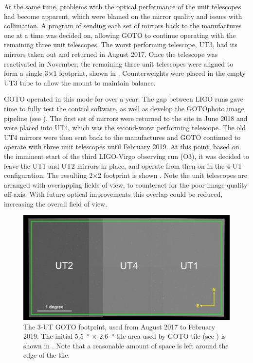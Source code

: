 \begin{colsection}
At the same time, problems with the optical performance of the unit telescopes had become apparent, which were blamed on the mirror quality and issues with collimation. A program of sending each set of mirrors back to the manufactures one at a time was decided on, allowing GOTO to continue operating with the remaining three unit telescopes. The worst performing telescope, UT3, had its mirrors taken out and returned in August 2017. Once the telescope was reactivated in November, the remaining three unit telescopes were aligned to form a single 3$\times$1 footprint, shown in . Counterweights were placed in the empty UT3 tube to allow the mount to maintain balance.

GOTO operated in this mode for over a year. The gap between LIGO runs gave time to fully test the control software, as well as develop the GOTOphoto image pipeline (see ). The first set of mirrors were returned to the site in June 2018 and were placed into UT4, which was the second-worst performing telescope. The old UT4 mirrors were then sent back to the manufactures and GOTO continued to operate with three unit telescopes until February 2019. At this point, based on the imminent start of the third LIGO-Virgo observing run (O3), it was decided to leave the UT1 and UT2 mirrors in place, and operate from then on in the 4-UT configuration. The resulting 2$\times$2 footprint is shown . Note the unit telescopes are arranged with overlapping fields of view, to counteract for the poor image quality off-axis. With future optical improvements this overlap could be reduced, increasing the overall field of view.

\begin{figure}[p]
    \begin{center}
        \includegraphics[width=0.7\linewidth]{images/footprint_1_box.png}
    \end{center}
    \caption[The previous 3-UT GOTO footprint]{
        The 3-UT GOTO footprint, used from August 2017 to February 2019.
        The initial \SI{5.5}{\degree} $\times$ \SI{2.6}{\degree} tile area used by GOTO-tile (see ) is shown in . Note that a reasonable amount of space is left around the edge of the tile.
    }\label{fig:3ut_footprint}
\end{figure}


\end{colsection}
